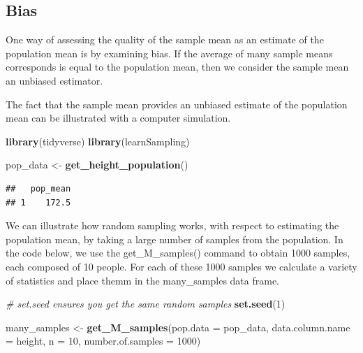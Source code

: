 \documentclass[
]{krantz}
\makeatletter
\newenvironment{Shaded}{\begin{snugshade}}{\end{snugshade}}
\newcommand{\CommentTok}[1]{\textcolor[rgb]{0.37,0.37,0.37}{\textit{#1}}}
\newcommand{\DataTypeTok}[1]{\textcolor[rgb]{0.27,0.27,0.27}{#1}}
\newcommand{\DecValTok}[1]{\textcolor[rgb]{0.06,0.06,0.06}{#1}}
\newcommand{\KeywordTok}[1]{\textcolor[rgb]{0.27,0.27,0.27}{\textbf{#1}}}
\newcommand{\NormalTok}[1]{#1}
\newcommand{\OperatorTok}[1]{\textcolor[rgb]{0.43,0.43,0.43}{\textbf{#1}}}
\newcommand{\StringTok}[1]{\textcolor[rgb]{0.5,0.5,0.5}{#1}}
\newenvironment{kframe}{%
\medskip{}
\setlength{\fboxsep}{.8em}
 \def\at@end@of@kframe{}%
 \ifinner\ifhmode%
  \def\at@end@of@kframe{\end{minipage}}%
  \begin{minipage}{\columnwidth}%
 \fi\fi%
 \def\FrameCommand##1{\hskip\@totalleftmargin \hskip-\fboxsep
 \colorbox{shadecolor}{##1}\hskip-\fboxsep
     \hskip-\linewidth \hskip-\@totalleftmargin \hskip\columnwidth}%
 \MakeFramed {\advance\hsize-\width
   \@totalleftmargin\z@ \linewidth\hsize
   \@setminipage}}%
 {\par\unskip\endMakeFramed%
 \at@end@of@kframe}
\renewenvironment{Shaded}{\begin{kframe}}{\end{kframe}}
\makeatother
\begin{document}
\hypertarget{bias}{%
\subsection{Bias}\label{bias}}

One way of assessing the quality of the sample mean as an estimate of the population mean is by examining bias. If the average of many sample means corresponds is equal to the population mean, then we consider the sample mean an unbiased estimator.

The fact that the sample mean provides an unbiased estimate of the population mean can be illustrated with a computer simulation.

\begin{Shaded}
\begin{Highlighting}[]
\KeywordTok{library}\NormalTok{(tidyverse)}
\KeywordTok{library}\NormalTok{(learnSampling)}

\NormalTok{pop_data <-}\StringTok{ }\KeywordTok{get_height_population}\NormalTok{() }
\end{Highlighting}
\end{Shaded}

\begin{Shaded}
\end{Shaded}

\begin{verbatim}
##   pop_mean
## 1    172.5
\end{verbatim}

We can illustrate how random sampling works, with respect to estimating the population mean, by taking a large number of samples from the population. In the code below, we use the get\_M\_samples() command to obtain 1000 samples, each composed of 10 people. For each of these 1000 samples we calculate a variety of statistics and place themm in the many\_samples data frame.

\begin{Shaded}
\begin{Highlighting}[]
\CommentTok{# set.seed ensures you get the same random samples}
\KeywordTok{set.seed}\NormalTok{(}\DecValTok{1}\NormalTok{) }

\NormalTok{many_samples <-}\StringTok{ }\KeywordTok{get_M_samples}\NormalTok{(}\DataTypeTok{pop.data =}\NormalTok{ pop_data, }
                              \DataTypeTok{data.column.name =}\NormalTok{ height,}
                              \DataTypeTok{n =} \DecValTok{10}\NormalTok{,}
                              \DataTypeTok{number.of.samples =} \DecValTok{1000}\NormalTok{)}
\end{Highlighting}
\end{Shaded}
\end{document}
